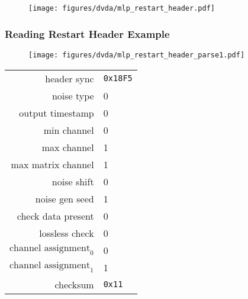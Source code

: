 \begin{figure}[h]
  \texttt{[image: figures/dvda/mlp\_restart\_header.pdf]}
\end{figure}

\clearpage

\subsubsection{Reading Restart Header Example}

\begin{figure}[h]
  \texttt{[image: figures/dvda/mlp\_restart\_header\_parse1.pdf]}
\end{figure}
\begin{table}[h]
{
  \begin{tabular}{rl}
    header sync & \texttt{0x18F5} \\
    noise type & 0 \\
    output timestamp & 0 \\
    min channel & 0 \\
    max channel & 1 \\
    max matrix channel & 1 \\
    noise shift & 0 \\
    noise gen seed & 1 \\
    check data present & 0 \\
    lossless check & 0 \\
    $\text{channel assignment}_0$ & 0 \\
    $\text{channel assignment}_1$ & 1 \\
    checksum & \texttt{0x11} \\
  \end{tabular}
}
\end{table}

\clearpage

